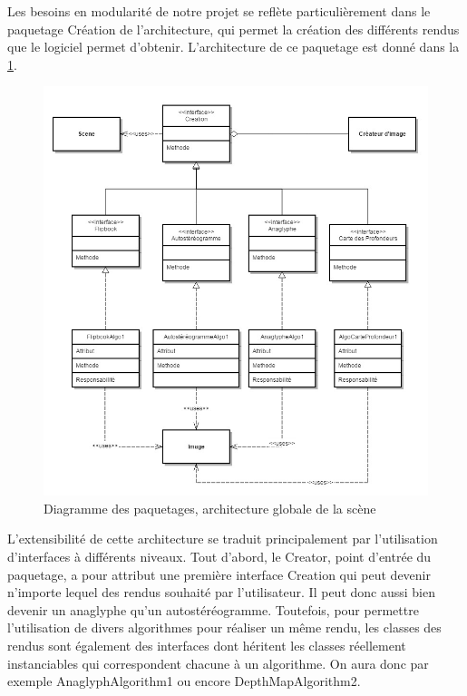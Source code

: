         Les besoins en modularité de notre projet se reflète particulièrement dans le paquetage Création de l'architecture, qui permet la création des différents rendus que le logiciel permet d'obtenir. L'architecture de ce paquetage est donné dans la \ref{fig:creation}.

\begin{figure}[h]
	\centering      
	\includegraphics[scale=0.45]{package_creation.jpg}
	\caption{\label{fig:creation} Diagramme des paquetages, architecture globale de la scène \protect \footnotemark}
\end{figure}

        L'extensibilité de cette architecture se traduit principalement par l'utilisation d'interfaces à différents niveaux. Tout d'abord, le Creator, point d'entrée du paquetage, a pour attribut une première interface Creation qui peut devenir n'importe lequel des rendus souhaité par l'utilisateur. Il peut donc aussi bien devenir un anaglyphe qu'un autostéréogramme. Toutefois, pour permettre l'utilisation de divers algorithmes pour réaliser un même rendu, les classes des rendus sont également des interfaces dont héritent les classes réellement instanciables qui correspondent chacune à un algorithme. On aura donc par exemple AnaglyphAlgorithm1 ou encore DepthMapAlgorithm2.
